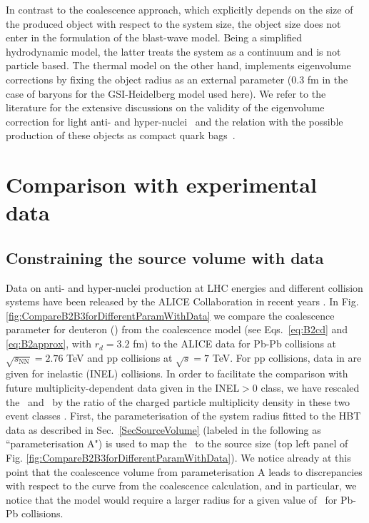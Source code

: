 In contrast to the coalescence approach, which explicitly depends on the size of the produced object with respect to the system size, the object size does not enter in the formulation of the blast-wave model. Being a simplified hydrodynamic model, the latter treats the system as a continuum and is not particle based. The thermal model on the other hand, implements eigenvolume corrections by fixing the object radius as an external parameter (0.3 fm in the case of baryons for the GSI-Heidelberg model used here). We refer to the literature for the extensive discussions on the validity of the eigenvolume correction for light anti- and hyper-nuclei~\cite{Vovchenko:2016mwg} and the relation with the possible production of these objects as compact quark bags~\cite{Andronic:2017}.


\section{Comparison with experimental data}\label{sec:comparison}

\subsection{Constraining the source volume with data}\label{sec:radiiParamet}

Data on anti- and hyper-nuclei production at LHC energies and different collision systems have been released by the ALICE Collaboration in recent years \cite{ALICE:nucleipp2017,ALICE:deuteronppPbPb2015,Acharya:2017dmc, Adam:2015yta}. 
In Fig. \ref{fig:CompareB2B3forDifferentParamWithData} we compare the coalescence parameter for deuteron (\btwo) from the coalescence model (see Eqs.~\ref{eq:B2cd} and \ref{eq:B2approx}, with $r_{d} = 3.2$ fm) to the ALICE data for Pb-Pb collisions at $\sqrt{s_{\mathrm{NN}}} = 2.76$ TeV and pp collisions at $\sqrt{s} = 7$ TeV. For pp collisions, data in  \cite{ALICE:nucleipp2017} are given for inelastic (INEL) collisions. In order to facilitate the comparison with future multiplicity-dependent data given in the INEL$>$0 class, we have rescaled the \btwo~and \bthree~by the ratio of the charged particle multiplicity density in these two event classes \cite{Adam:2015gka}.
First, the parameterisation of the system radius fitted to the HBT data as described in Sec.~\ref{SecSourceVolume} (labeled in the following as ``parameterisation A") is used to map the \avdNdeta~to the source size (top left panel of Fig. \ref{fig:CompareB2B3forDifferentParamWithData}). 
We notice already at this point that the coalescence volume from parameterisation A leads to discrepancies with respect to the curve from the coalescence calculation, and in particular, we notice that the model would require a larger radius for a given value of \btwo~for Pb-Pb collisions.

